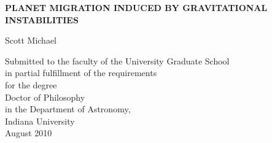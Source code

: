 %
%

%
%

\pagestyle{empty}
\begin{spacing}{1.0}

\hbox{}
\vspace{1.0in}

\begin{center}
\begin{Large}
\begin{spacing}{1.2}
\textbf{PLANET MIGRATION INDUCED BY GRAVITATIONAL INSTABILITIES}
\end{spacing}
\end{Large}

\vspace{2.0in}

\begin{large}
Scott Michael
\end{large}

\vspace{2.25in}

Submitted to the faculty of the University Graduate School \\
in partial fulfillment of the requirements \\
for the degree \\
Doctor of Philosophy \\
in the Department of Astronomy, \\
Indiana University \\
August 2010
\end{center}

\end{spacing}

\clearpage

%
%

\pagestyle{plain}
\setcounter{page}{2}

%
%


